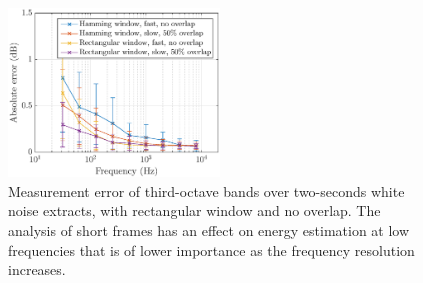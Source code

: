 \documentclass[sensors,article,submit,moreauthors,pdftex,10pt,a4paper]{mdpi}
\begin{document}
\begin{figure}[h!]
    \centering
    \includegraphics[width=0.5\textwidth]{figures/err_m_n.eps}
    \caption{Measurement error of third-octave bands over two-seconds white noise extracts, with rectangular window and no overlap. The analysis of short frames has an effect on energy estimation at low frequencies that is of lower importance as the frequency resolution increases.\label{fig:errormn}}
\end{figure}
\end{document}
